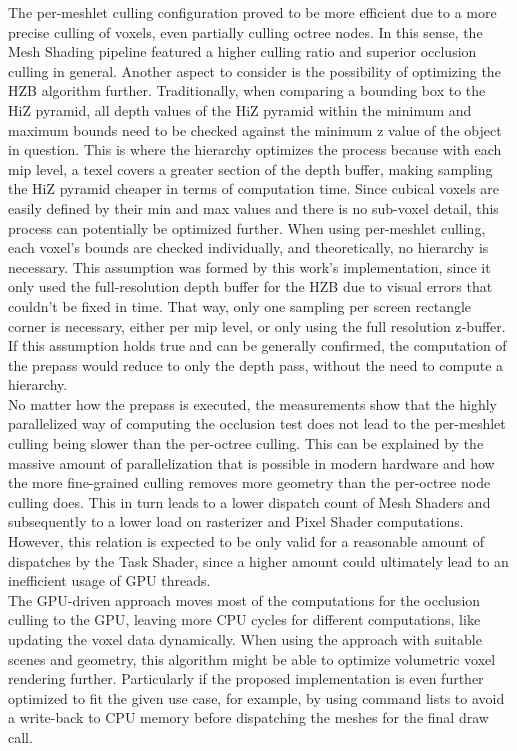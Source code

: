 \noindent
The per-meshlet culling configuration proved to be more efficient due to a more precise culling of voxels, even partially culling octree nodes.
In this sense, the Mesh Shading pipeline featured a higher culling ratio and superior occlusion culling in general. Another aspect to consider 
is the possibility of optimizing the \ac{HZB} algorithm further. Traditionally, when comparing a bounding box to the \ac{HiZ} pyramid, all depth 
values of the \ac{HiZ} pyramid within the minimum and maximum bounds need to be checked against the minimum z value of the object in question.
This is where the hierarchy optimizes the process because with each mip level, a texel covers a greater section of the depth buffer, making 
sampling the \ac{HiZ} pyramid cheaper in terms of computation time. Since cubical voxels are easily defined by their min and max values and 
there is no sub-voxel detail, this process can potentially be optimized further. When using per-meshlet culling, each voxel's bounds are 
checked individually, and theoretically, no hierarchy is necessary. This assumption was formed by this work's implementation, since it only used 
the full-resolution depth buffer for the \ac{HZB} due to visual errors that couldn't be fixed in time. That way, only one sampling per screen 
rectangle corner is necessary, either per mip level, or only using the full resolution z-buffer. If this assumption holds true and can be 
generally confirmed, the computation of the prepass would reduce to only the depth pass, without the need to compute a hierarchy. \\

\noindent
No matter how the prepass is executed, the measurements show that the highly parallelized way of computing the occlusion test does not lead to 
the per-meshlet culling being slower than the per-octree culling. This can be explained by the massive amount of parallelization that is 
possible in modern hardware and how the more fine-grained culling removes more geometry than the per-octree node culling does. This in turn leads 
to a lower dispatch count of Mesh Shaders and subsequently to a lower load on rasterizer and Pixel Shader computations. However, this relation 
is expected to be only valid for a reasonable amount of dispatches by the Task Shader, since a higher amount could ultimately lead to an inefficient 
usage of \ac{GPU} threads. \\

\noindent
The \ac{GPU}-driven approach moves most of the computations for the occlusion culling to the \ac{GPU}, leaving more \ac{CPU} cycles for different 
computations, like updating the voxel data dynamically. When using the approach with suitable scenes and geometry, this algorithm might be able 
to optimize volumetric voxel rendering further. Particularly if the proposed implementation is even further optimized to fit the given use case, 
for example, by using command lists to avoid a write-back to \ac{CPU} memory before dispatching the meshes for the final draw call. \\

